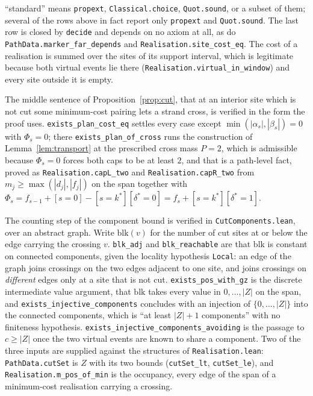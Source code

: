 \documentclass[11pt]{article}
\theoremstyle{plain}
\theoremstyle{definition}
\theoremstyle{remark}
\begin{document}
\noindent ``standard'' means \texttt{propext}, \texttt{Classical.choice},
\texttt{Quot.sound}, or a subset of them; several of the rows above in fact report only
\texttt{propext} and \texttt{Quot.sound}. The last row is closed by \texttt{decide} and depends
on no axiom at all, as do \texttt{PathData.marker\_far\_depends} and
\texttt{Realisation.site\_cost\_eq}. The cost of a realisation is summed over the sites of its
support interval, which is legitimate because both virtual events lie there
(\texttt{Realisation.virtual\_in\_window}) and every site outside it is empty.

The middle sentence of Proposition~\ref{prop:cut}, that at an interior site which is not cut some
minimum-cost pairing lets a strand cross, is verified in the form the proof uses.
\texttt{exists\_plan\_cost\_eq} settles every case except $\min(|\alpha_s|,|\beta_s|)=0$ with
$\Phi_s=0$; there \texttt{exists\_plan\_of\_cross} runs the construction of
Lemma~\ref{lem:transport} at the prescribed cross mass $P=2$, which is admissible because
$\Phi_s=0$ forces both caps to be at least $2$, and that is a path-level fact, proved as
\texttt{Realisation.capL\_two} and \texttt{Realisation.capR\_two} from
$m_j\ge\max(|d_j|,|f_j|)$ on the span together with
$\Phi_s=f_{s-1}+[s{=}0]-[s{=}k^\ast][\delta^\ast{=}0]=f_s+[s{=}k^\ast][\delta^\ast{=}1]$.

The counting step of the component bound is verified in \texttt{CutComponents.lean}, over an
abstract graph. Write $\mathrm{blk}(v)$ for the number of cut sites at or below the edge carrying
the crossing $v$. \texttt{blk\_adj} and \texttt{blk\_reachable} are that $\mathrm{blk}$ is constant
on connected components, given the locality hypothesis \texttt{Local}: an edge of the graph joins
crossings on the two edges adjacent to one site, and joins crossings on \emph{different} edges only
at a site that is not cut. \texttt{exists\_pos\_with\_gz} is the discrete intermediate value
argument, that $\mathrm{blk}$ takes every value in $0,\dots,|Z|$ on the span, and
\texttt{exists\_injective\_components} concludes with an injection of $\{0,\dots,|Z|\}$ into the
connected components, which is ``at least $|Z|+1$ components'' with no finiteness hypothesis.
\texttt{exists\_injective\_components\_avoiding} is the passage to $c\ge|Z|$ once the two virtual
events are known to share a component. Two of the three inputs are supplied against the structures
of \texttt{Realisation.lean}: \texttt{PathData.cutSet} is $Z$ with its two bounds
(\texttt{cutSet\_lt}, \texttt{cutSet\_le}), and \texttt{Realisation.m\_pos\_of\_min} is the
occupancy, every edge of the span of a minimum-cost realisation carrying a crossing.
\end{document}
